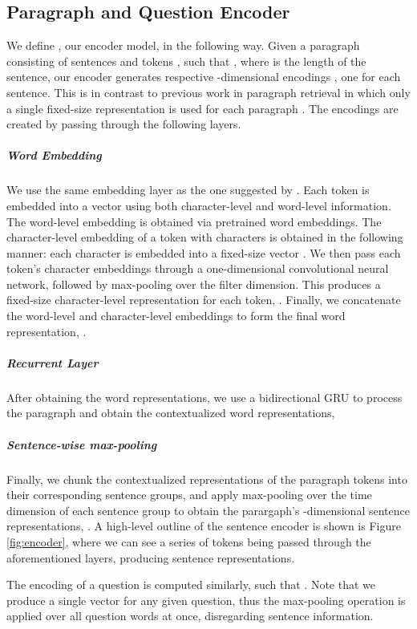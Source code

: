 \documentclass[11pt,a4paper,dvipsnames]{article}
\begin{document}
\subsection{Paragraph and Question Encoder}
\label{sec:encoder}
We define , our encoder model, in the following way. 
Given a paragraph  consisting of  sentences  and  tokens , such that , where  is the length of the sentence, our encoder generates  respective -dimensional encodings , one for each sentence. This is in contrast to previous work in paragraph retrieval in which only a single fixed-size representation is used for each paragraph \citep{LeeYKKK18answerrecall, das2018multistep}. The encodings are created by passing  through the following layers.

\subparagraph{Word Embedding}
We use the same embedding layer as the one suggested by \citet{GardnerC18snorm}. Each token  is embedded into a vector  using both character-level and word-level information. The word-level embedding  is obtained via pretrained word embeddings. The character-level embedding of a token  with  characters  is obtained in the following manner: each character  is embedded into a fixed-size vector . We then pass each token's character embeddings through a one-dimensional convolutional neural network, followed by max-pooling over the filter dimension. This produces a fixed-size character-level representation for each token, .  Finally, we concatenate the word-level and character-level embeddings to form the final word representation, .

\subparagraph{Recurrent Layer}
After obtaining the word representations, we use a bidirectional GRU \citep{ChoMGBBSB14gru} to process the paragraph and obtain the contextualized word representations, 

\subparagraph{Sentence-wise max-pooling}
Finally, we chunk the contextualized representations of the paragraph tokens into their corresponding sentence groups, and apply max-pooling over the time dimension of each sentence group to obtain the parargaph's -dimensional sentence representations, .
A high-level outline of the sentence encoder is shown is Figure \ref{fig:encoder}, where we can see a series of  tokens being passed through the aforementioned layers, producing  sentence representations.
\par
The encoding  of a question  is computed similarly, such that . Note that we produce a single vector for any given question, thus the max-pooling operation is applied over all question words at once, disregarding sentence information.
\end{document}
